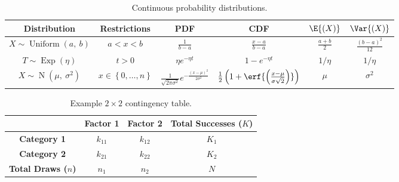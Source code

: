 \documentclass{article}
\begin{document}
\begin{table}[H]
    \centering
    \begin{tabular}{c c c c c c}
        \toprule
        \textbf{Distribution}                                       & \textbf{Restrictions}                  & \textbf{PDF}                                                                         & \textbf{CDF}                                                                            & \(\E{\left( X \right)}\) & \(\Var{\left( X \right)}\)            \\
        \midrule
        \(X \sim \operatorname{Uniform}{\left( a,\: b \right)}\)    & \(a < x < b\)                          & \(\frac{1}{b - a}\)                                                                  & \(\frac{x - a}{b - a}\)                                                                 & \(\frac{a + b}{2}\)      & \(\frac{\left( b - a \right)^2}{12}\) \\
        \(T \sim \operatorname{Exp}{\left( \eta \right)}\)          & \(t > 0\)                              & \(\eta e^{-\eta t}\)                                                                 & \(1 - e^{-\eta t}\)                                                                     & \(1/\eta\)               & \(1/\eta\)                            \\
        \(X \sim \operatorname{N}{\left( \mu,\: \sigma^2 \right)}\) & \(x \in \left\{ 0, \dots, n \right\}\) & \(\frac{1}{\sqrt{2 \pi \sigma^2}} e^{-\frac{\left( x - \mu \right)^2}{2 \sigma^2}}\) & \(\frac{1}{2} \left( 1 + \erf{\left( \frac{x - \mu}{\sigma \sqrt{2}} \right)} \right)\) & \(\mu\)                  & \(\sigma^2\)                          \\
        \bottomrule
    \end{tabular}
    \caption{Continuous probability distributions.} %
\end{table}
\begin{table}[H]
    \centering
    \begin{tabular}{c c c c}
        \toprule
                                     & \textbf{Factor 1} & \textbf{Factor 2} & \textbf{Total Successes (\(K\))} \\
        \midrule
        \textbf{Category 1}          & \(k_{11}\)        & \(k_{12}\)        & \(K_1\)                          \\
        \textbf{Category 2}          & \(k_{21}\)        & \(k_{22}\)        & \(K_2\)                          \\
        \textbf{Total Draws (\(n\))} & \(n_1\)           & \(n_2\)           & \(N\)                            \\
        \bottomrule
    \end{tabular}
    \caption{Example \(2 \times 2\) contingency table.} %
\end{table}
\end{document}
